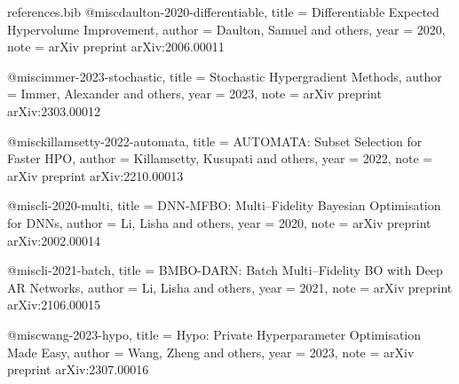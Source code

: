 \begin{filecontents*}{references.bib}
@misc{daulton-2020-differentiable,
  title        = {Differentiable Expected Hypervolume Improvement},
  author       = {Daulton, Samuel and others},
  year         = {2020},
  note         = {arXiv preprint arXiv:2006.00011}
}

@misc{immer-2023-stochastic,
  title        = {Stochastic Hypergradient Methods},
  author       = {Immer, Alexander and others},
  year         = {2023},
  note         = {arXiv preprint arXiv:2303.00012}
}

@misc{killamsetty-2022-automata,
  title        = {AUTOMATA: Subset Selection for Faster HPO},
  author       = {Killamsetty, Kusupati and others},
  year         = {2022},
  note         = {arXiv preprint arXiv:2210.00013}
}

@misc{li-2020-multi,
  title        = {DNN-MFBO: Multi–Fidelity Bayesian Optimisation for DNNs},
  author       = {Li, Lisha and others},
  year         = {2020},
  note         = {arXiv preprint arXiv:2002.00014}
}

@misc{li-2021-batch,
  title        = {BMBO-DARN: Batch Multi–Fidelity BO with Deep AR Networks},
  author       = {Li, Lisha and others},
  year         = {2021},
  note         = {arXiv preprint arXiv:2106.00015}
}

@misc{wang-2023-hypo,
  title        = {Hypo: Private Hyperparameter Optimisation Made Easy},
  author       = {Wang, Zheng and others},
  year         = {2023},
  note         = {arXiv preprint arXiv:2307.00016}
}
\end{filecontents*}



\documentclass{article}


\usepackage{agents4science_2025}

\usepackage[utf8]{inputenc}
\usepackage[T1]{fontenc}

\usepackage{amsmath}
\usepackage{amsfonts}
\usepackage{nicefrac}

\usepackage{graphicx}
\graphicspath{{images/}}   %

\usepackage{subcaption}
\usepackage{multirow}
\usepackage{array}
\usepackage{tabularx}
\usepackage{colortbl}
\usepackage{xcolor}

\usepackage{tikz}
\usepackage{pgfplots}
\pgfplotsset{compat=1.18}  %

